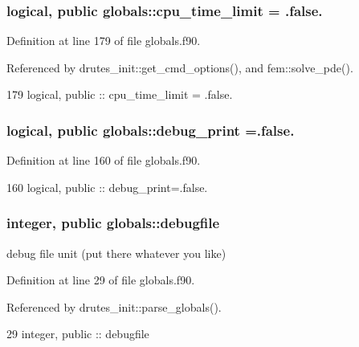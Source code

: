 \subsubsection[{cpu\+\_\+time\+\_\+limit}]{\setlength{\rightskip}{0pt plus 5cm}logical, public globals\+::cpu\+\_\+time\+\_\+limit = .false.}\label{namespaceglobals_afe6ac7dd3036ae8ad216c8a0132d42df}


Definition at line 179 of file globals.\+f90.



Referenced by drutes\+\_\+init\+::get\+\_\+cmd\+\_\+options(), and fem\+::solve\+\_\+pde().


\begin{DoxyCode}
179   \textcolor{keywordtype}{logical}, \textcolor{keywordtype}{public} :: cpu_time_limit = .false.
\end{DoxyCode}
\subsubsection[{debug\+\_\+print}]{\setlength{\rightskip}{0pt plus 5cm}logical, public globals\+::debug\+\_\+print =.false.}\label{namespaceglobals_afcd04bca186edf2a074b2a36e42625cb}


Definition at line 160 of file globals.\+f90.


\begin{DoxyCode}
160   \textcolor{keywordtype}{logical}, \textcolor{keywordtype}{public} :: debug_print=.false.
\end{DoxyCode}
\subsubsection[{debugfile}]{\setlength{\rightskip}{0pt plus 5cm}integer, public globals\+::debugfile}\label{namespaceglobals_abcb2fc9fcd8a8ed0153e3be76f6134a6}


debug file unit (put there whatever you like) 



Definition at line 29 of file globals.\+f90.



Referenced by drutes\+\_\+init\+::parse\+\_\+globals().


\begin{DoxyCode}
29   \textcolor{keywordtype}{integer}, \textcolor{keywordtype}{public} :: debugfile
\end{DoxyCode}
